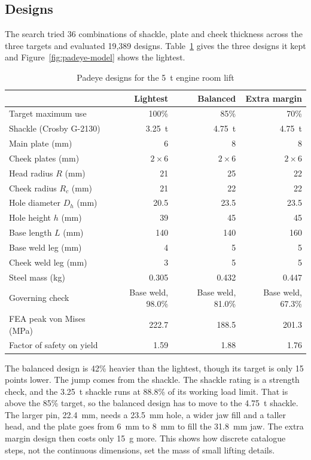 \subsection{Designs}

The search tried 36 combinations of shackle, plate and cheek thickness across
the three targets and evaluated 19,389 designs. Table~\ref{tab:padeye-designs}
gives the three designs it kept and Figure~\ref{fig:padeye-model} shows the
lightest.

\begin{table}[H]
\centering
\caption{Padeye designs for the 5~t engine room lift}
\label{tab:padeye-designs}
\small
\begin{tabularx}{\textwidth}{Xrrr}
\toprule
& \textbf{Lightest} & \textbf{Balanced} & \textbf{Extra margin}\\
\midrule
Target maximum use & 100\% & 85\% & 70\%\\
Shackle (Crosby G-2130) & 3.25~t & 4.75~t & 4.75~t\\
Main plate (mm) & 6 & 8 & 8\\
Cheek plates (mm) & $2 \times 6$ & $2 \times 6$ & $2 \times 6$\\
Head radius $R$ (mm) & 21 & 25 & 22\\
Cheek radius $R_c$ (mm) & 21 & 22 & 22\\
Hole diameter $D_h$ (mm) & 20.5 & 23.5 & 23.5\\
Hole height $h$ (mm) & 39 & 45 & 45\\
Base length $L$ (mm) & 140 & 140 & 160\\
Base weld leg (mm) & 4 & 5 & 5\\
Cheek weld leg (mm) & 3 & 5 & 5\\
Steel mass (kg) & 0.305 & 0.432 & 0.447\\
Governing check & Base weld, 98.0\% & Base weld, 81.0\% & Base weld, 67.3\%\\
FEA peak von Mises (MPa) & 222.7 & 188.5 & 201.3\\
Factor of safety on yield & 1.59 & 1.88 & 1.76\\
\bottomrule
\end{tabularx}
\end{table}

The balanced design is 42\% heavier than the lightest, though its target is
only 15 points lower. The jump comes from the shackle. The shackle rating is a
strength check, and the 3.25~t shackle runs at 88.8\% of its working load
limit. That is above the 85\% target, so the balanced design has to move to
the 4.75~t shackle. The larger pin, 22.4~mm, needs a 23.5~mm hole, a wider
jaw fill and a taller head, and the plate goes from 6~mm to 8~mm to fill the
31.8~mm jaw. The extra margin design then costs only 15~g more. This shows how
discrete catalogue steps, not the continuous dimensions, set the mass of small
lifting details.

